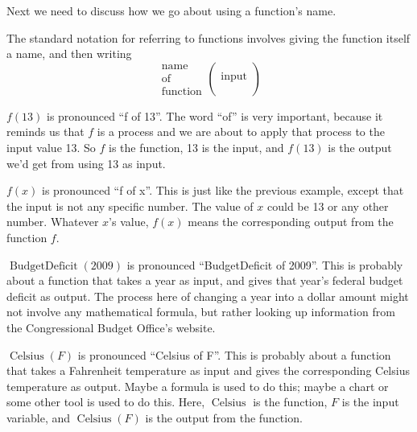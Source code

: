 	Next we need to discuss how we go about using a function's name.
	\begin{pccspecialcomment}
		The standard notation for referring to functions involves giving the function itself a name, and then writing
		\[
			\begin{array}{cc}
				\text{name}\\
				\text{of}\\
				\text{function}
			\end{array}
			\left(
			\begin{array}{cc}
				\\
				\text{input}\\
				\\						
			\end{array}\right)
		\]
	\end{pccspecialcomment}
	\begin{pccexample}
	$f(\num{13})$ is pronounced ``f of 13''. The word ``of'' is very important, 
	because it reminds us that $f$ is a process and we are about to apply that
	process to the input value \num{13}. So $f$ is the function, \num{13} is the
	input, and $f(\num{13})$ is the output we'd get from using \num{13} as input.
	
	$f(x)$ is pronounced ``f of x''. This is just like the previous example,
	except that the input is not any specific number. The value of $x$ could be
	\num{13} or any other number. Whatever $x$'s value, $f(x)$ means the corresponding
	output from the function $f$.
	
	$\operatorname{BudgetDeficit}(2009)$ is pronounced ``BudgetDeficit of 2009''.
	This is probably about a function that takes a year as input, and gives that
	year's federal budget deficit as output. The process here of changing a year
	into a dollar amount might not involve any mathematical formula, but rather
	looking up information from the Congressional Budget Office's website.
	
	$\operatorname{Celsius}(F)$ is pronounced ``Celsius of F''. This is probably
	about a function that takes a Fahrenheit temperature as input and gives the
	corresponding Celsius temperature as output. Maybe a formula is used to do this; 
	maybe a chart or some other tool is used to do this. Here, $\operatorname{Celsius}$
	is the function, $F$ is the input variable, and $\operatorname{Celsius}(F)$ is the output from the function.
	\end{pccexample}
